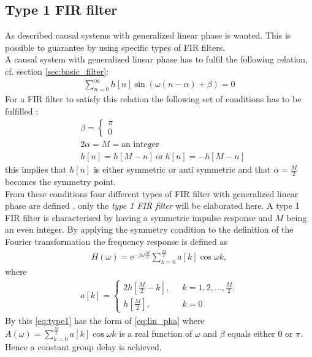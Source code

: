 \subsection{Type 1 FIR filter}
As described causal systems with generalized linear phase is wanted. This is possible to guarantee by using specific types of FIR filters.\\
A causal system with generalized linear phase has to fulfil the following relation, cf. section \ref{sec:basic_filter}:
\begin{align}
\sum_{n=0}^{\infty}h[n]\sin\left(\omega \left(n-\alpha \right) + \beta \right) = 0
\end{align}
For a FIR filter to satisfy this relation the following set of conditions has to be fulfilled \cite{DTSP, p.342}:
\begin{align} \label{eq:FIR_con}
&\beta = \left\{ \begin{matrix} 
\pi  \\
0 
\end{matrix}\right. \nonumber  \\ 
&2\alpha = M = \text{an integer} \\ 
&h[n]=h[M-n] \ \text{or} \ h[n]=-h[M-n] \nonumber  
\end{align} 
this implies that $h[n]$ is either symmetric or anti symmetric and that $\alpha = \frac{M}{2}$ becomes the symmetry point. \\
From these conditions four different types of FIR filter with generalized linear phase are defined \cite{DTSP, p. 343}, only the \textit{type 1 FIR filter} will be elaborated here.
A type 1 FIR filter is characterised by having a symmetric impulse response and $M$ being an even integer. By applying the symmetry condition to the definition of the Fourier transformation the frequency response is defined as \cite{p. 343,DTSP}   
\begin{align}\label{eq:type1}
H(\omega)=\text{e}^{-j\omega \frac{M}{2}} \sum_{k=0}^{\frac{M}{2}} a[k]\cos \omega k,
\end{align}
where 
\begin{align}
a[k]= \left\{ \begin{matrix}
2h\left[ \frac{M}{2} - k \right], \ \ &\ k=1,2,... , \frac{M}{2}.   \\
h[\frac{M}{2}], \ \ &\ k = 0  
\end{matrix}\right.
\end{align}
By this \eqref{eq:type1} has the form of \eqref{eq:lin_pha} where $A(\omega)= \sum_{k=0}^{\frac{M}{2}} a[k]\cos \omega k$ is a real function of $\omega$ and $\beta$ equals either 0 or $\pi$. Hence a constant group delay is achieved.








   
 


 



